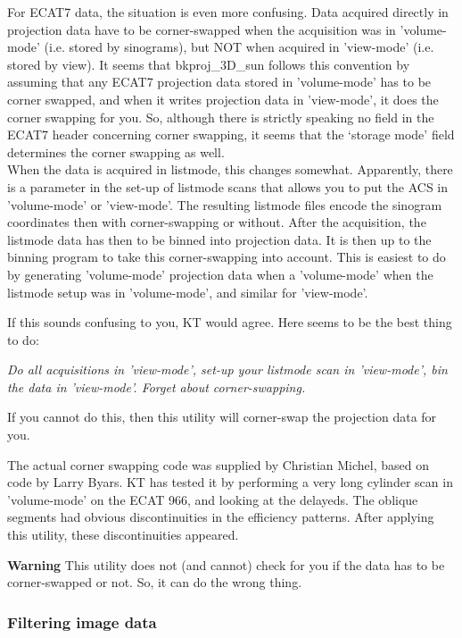 \documentclass{article}
\begin{document}
For ECAT7 data, the situation is even more confusing. Data acquired 
directly in projection data have to be corner-swapped when the 
acquisition was in 'volume-mode' (i.e. stored by sinograms), 
but NOT when acquired in 'view-mode' (i.e. stored by view). It 
seems that bkproj\_3D\_sun follows this convention by assuming 
that any ECAT7 projection data stored in 'volume-mode' has to 
be corner swapped, and when it writes projection data in 'view-mode', 
it does the corner swapping for you. So, although there is strictly 
speaking no field in the ECAT7 header concerning corner swapping, 
it seems that the `storage mode' field determines the corner swapping 
as well.\\
When the data is acquired in listmode, this changes somewhat. 
Apparently, there is a parameter in the set-up of listmode scans 
that allows you to put the ACS in 'volume-mode' or 'view-mode'. 
The resulting listmode files encode the sinogram coordinates 
then with corner-swapping or without. After the acquisition, 
the listmode data has then to be binned into projection data. 
It is then up to the binning program to take this corner-swapping 
into account. This is easiest to do by generating 'volume-mode' 
projection data when a 'volume-mode' when the listmode setup 
was in 'volume-mode', and similar for 'view-mode'.


If this sounds confusing to you, KT would agree. Here seems to 
be the best thing to do:


\textit{Do all acquisitions in 'view-mode', set-up your listmode 
scan in 'view-mode', bin the data in 'view-mode'. Forget about 
corner-swapping.}


If you cannot do this, then this utility will corner-swap the 
projection data for you.

{ 
}

The actual corner swapping code was supplied by Christian Michel, 
based on code by Larry Byars. KT has tested it by performing 
a very long cylinder scan in 'volume-mode' on the ECAT 966, and 
looking at the delayeds. The oblique segments had obvious discontinuities 
in the efficiency patterns. After applying this utility, these 
discontinuities appeared.



\textbf{Warning} This utility does not (and cannot) check for you 
if the data has to be corner-swapped or not. So, it can do the 
wrong thing.


\subsubsection{
Filtering image data}
\end{document}
